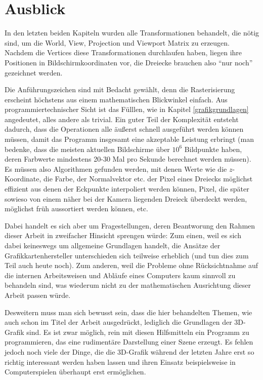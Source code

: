 \chapter{Ausblick}

In den letzten beiden Kapiteln wurden alle Transformationen behandelt, die nötig sind, um die World, View, Projection und Viewport Matrix zu erzeugen. Nachdem die Vertices diese Transformationen durchlaufen haben, liegen ihre Positionen in Bildschirmkoordinaten vor, die Dreiecke brauchen also \enquote{nur noch} gezeichnet werden.

Die Anführungszeichen sind mit Bedacht gewählt, denn die Rasterisierung erscheint höchstens aus einem mathematischen Blickwinkel einfach. Aus programmiertechnischer Sicht ist das Fülllen, wie in Kapitel \ref{grafikgrundlagen} angedeutet, alles andere als trivial. Ein guter Teil der Komplexität entsteht dadurch, dass die Operationen alle äußerst schnell ausgeführt werden können müssen, damit das Programm insgesamt eine akzeptable Leistung erbringt (man bedenke, dass die meisten aktuellen Bildschirme über $10^6$ Bildpunkte haben, deren Farbwerte mindestens 20-30 Mal pro Sekunde berechnet werden müssen). Es müssen also Algorithmen gefunden werden, mit denen Werte wie die $z$-Koordinate, die Farbe, der Normalvektor etc. der Pixel eines Dreiecks möglichst effizient aus denen der Eckpunkte interpoliert werden können, Pixel, die später sowieso von einem näher bei der Kamera liegenden Dreieck überdeckt werden, möglichst früh aussortiert werden können, etc.

Dabei handelt es sich aber um Fragestellungen, deren Beantworung den Rahmen dieser Arbeit in zweifacher Hinsicht sprengen würde: Zum einen, weil es sich dabei keineswegs um allgemeine Grundlagen handelt, die Ansätze der Grafikkartenhersteller unterschieden sich teilweise erheblich (und tun dies zum Teil auch heute noch). Zum anderen, weil die Probleme ohne Rücksichtnahme auf die internen Arbeitsweisen und Abläufe eines Computers kaum sinnvoll zu behandeln sind, was wiederum nicht zu der mathematischen Ausrichtung dieser Arbeit passen würde.

Desweitern muss man sich bewusst sein, dass die hier behandelten Themen, wie auch schon im Titel der Arbeit ausgedrückt, lediglich die Grundlagen der 3D-Grafik sind. Es ist zwar möglich, rein mit diesen Hilfsmitteln ein Programm zu programmieren, das eine rudimentäre Darstellung einer Szene erzeugt. Es fehlen jedoch noch viele der Dinge, die die 3D-Grafik während der letzten Jahre erst so richtig interessant werden haben lassen und ihren Einsatz beispielsweise in Computerspielen überhaupt erst ermöglichen.

